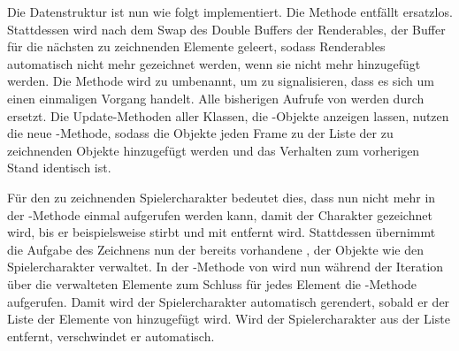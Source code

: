 Die Datenstruktur ist nun wie folgt implementiert. Die Methode  entfällt ersatzlos. Stattdessen wird nach dem Swap des Double Buffers der Renderables, der Buffer für die nächsten zu zeichnenden Elemente geleert, sodass Renderables automatisch nicht mehr gezeichnet werden, wenn sie nicht mehr hinzugefügt werden. Die Methode  wird zu  umbenannt, um zu signalisieren, dass es sich um einen einmaligen Vorgang handelt. Alle bisherigen Aufrufe von  werden durch  ersetzt. Die Update-Methoden aller Klassen, die -Objekte anzeigen lassen, nutzen die neue -Methode, sodass die Objekte jeden Frame zu der Liste der zu zeichnenden Objekte hinzugefügt werden und das Verhalten zum vorherigen Stand identisch ist.

Für den zu zeichnenden Spielercharakter bedeutet dies, dass nun nicht mehr in der -Methode einmal  aufgerufen werden kann, damit der Charakter gezeichnet wird, bis er beispielsweise stirbt und mit  entfernt wird. Stattdessen übernimmt die Aufgabe des Zeichnens nun der bereits vorhandene , der Objekte wie den Spielercharakter verwaltet. In der -Methode von  wird nun während der Iteration über die verwalteten Elemente zum Schluss für jedes Element die -Methode aufgerufen. Damit wird der Spielercharakter automatisch gerendert, sobald er der Liste der Elemente von  hinzugefügt wird. Wird der Spielercharakter aus der Liste entfernt, verschwindet er automatisch.

